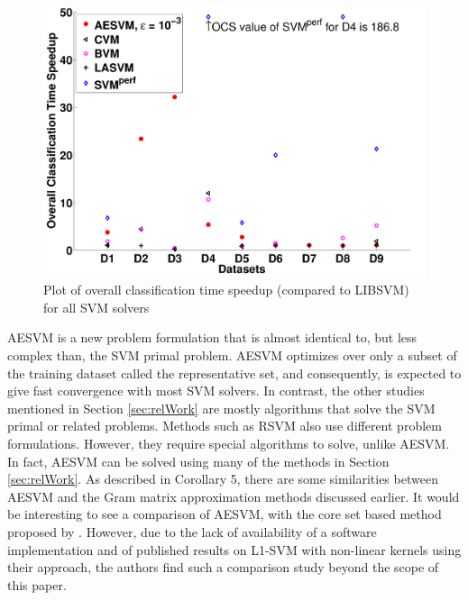 \documentclass[twoside]{article}
\begin{document}
\begin{figure}[h!]
\centering
\includegraphics[scale = 0.44]{summaryOCS}
\caption{Plot of overall classification time speedup (compared to LIBSVM) for all SVM solvers}\label{fig:resSummary4}
\end{figure}

AESVM is a new problem formulation that is almost identical to, but less complex than, the SVM primal problem. AESVM optimizes over only a subset of the training dataset called the representative set, and consequently, is expected to give fast convergence with most SVM solvers. In contrast, the other studies mentioned in Section \ref{sec:relWork} are mostly algorithms that solve the SVM primal or related problems. Methods such as RSVM also use different problem formulations. However, they require special algorithms to solve, unlike AESVM. In fact, AESVM can be solved using many of the methods in Section \ref{sec:relWork}. As described in Corollary 5, there are some similarities between AESVM and the Gram matrix approximation methods discussed earlier. It would be interesting to see a comparison of AESVM, with the core set based method proposed by \citet{Gartner09}. However, due to the lack of availability of a software implementation and of published results on L1-SVM with non-linear kernels using their approach, the authors find such a comparison study beyond the scope of this paper.
\end{document}
